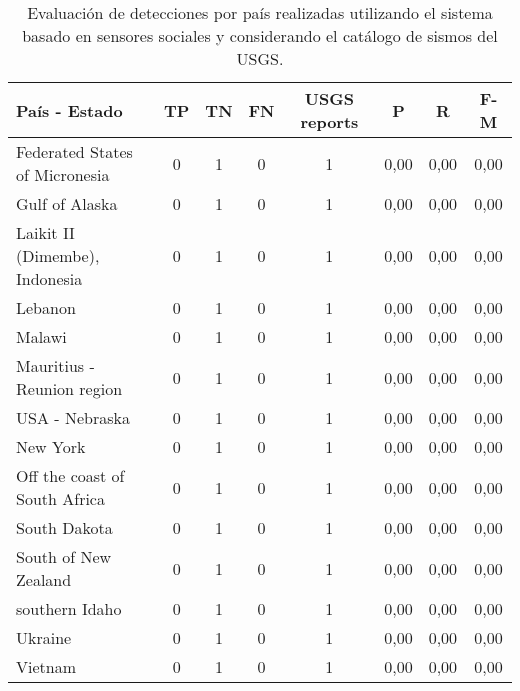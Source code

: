{\small
\begin{table}[!ht]
\centering
  \begin{tabular}{|l|ccc|c|ccc|}
  \hline
  País - Estado & TP & TN & FN & USGS reports & P & R & F-M \\
  \hline \hline
Federated States of Micronesia	 & 0   	 & 1 	 & 0   	& 1	 & 0,00 &	0,00 &	0,00 \\ \hline
Gulf of Alaska	 & 0   	 & 1 	 & 0   	& 1	 & 0,00 &	0,00 &	0,00 \\ \hline
Laikit II (Dimembe), Indonesia	 & 0   	 & 1 	 & 0   	& 1	 & 0,00 &	0,00 &	0,00 \\ \hline
Lebanon	 & 0   	 & 1 	 & 0   	& 1	 & 0,00 &	0,00 &	0,00 \\ \hline
Malawi	 & 0   	 & 1 	 & 0   	& 1	 & 0,00 &	0,00 &	0,00 \\ \hline
Mauritius - Reunion region	 & 0   	 & 1 	 & 0   	& 1	 & 0,00 &	0,00 &	0,00 \\ \hline
USA - Nebraska	 & 0   	 & 1 	 & 0   	& 1	 & 0,00 &	0,00 &	0,00 \\ \hline
New York	 & 0   	 & 1 	 & 0   	& 1	 & 0,00 &	0,00 &	0,00 \\ \hline
Off the coast of South Africa	 & 0   	 & 1 	 & 0   	& 1	 & 0,00 &	0,00 &	0,00 \\ \hline
South Dakota	 & 0   	 & 1 	 & 0   	& 1	 & 0,00 &	0,00 &	0,00 \\ \hline
South of New Zealand	 & 0   	 & 1 	 & 0   	& 1	 & 0,00 &	0,00 &	0,00 \\ \hline
southern Idaho	 & 0   	 & 1 	 & 0   	& 1	 & 0,00 &	0,00 &	0,00 \\ \hline
Ukraine	 & 0   	 & 1 	 & 0   	& 1	 & 0,00 &	0,00 &	0,00 \\ \hline
Vietnam	 & 0   	 & 1 	 & 0   	& 1	 & 0,00 &	0,00 &	0,00 \\ \hline
   \end{tabular}
  \caption{Evaluación de detecciones por país realizadas utilizando el sistema basado en sensores sociales y considerando el catálogo de sismos del USGS.}
  \label{table:all-detections-07}
\end{table}}
